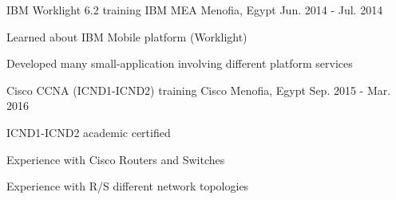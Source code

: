 
\begin{cventries}

  \cventry
    {IBM Worklight 6.2 training} %
    {IBM MEA} %
    {Menofia, Egypt} %
    {Jun. 2014 - Jul. 2014} %
    {
      \begin{cvitems} %
        \item {Learned about IBM Mobile platform (Worklight)}
        \item {Developed many small-application involving different platform services}
      \end{cvitems}
    }

  \cventry
    {Cisco CCNA (ICND1-ICND2) training} %
    {Cisco} %
    {Menofia, Egypt} %
    {Sep. 2015 - Mar. 2016} %
    {
      \begin{cvitems} %
        \item {ICND1-ICND2 academic certified}
        \item {Experience with Cisco Routers and Switches}
        \item {Experience with R/S different network topologies}
      \end{cvitems}
    }

\end{cventries}